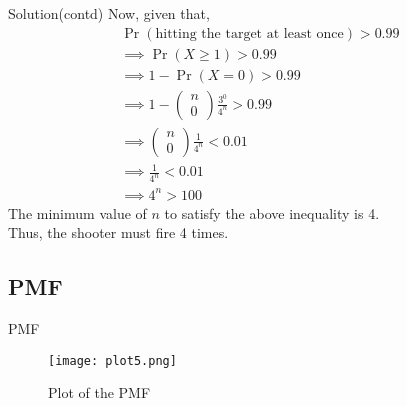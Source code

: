 \documentclass{beamer}
\newcommand{\myvec}[1]{\ensuremath{\begin{pmatrix}#1\end{pmatrix}}}
\providecommand{\pr}[1]{\ensuremath{\Pr\left(#1\right)}}
\begin{document}
\begin{frame}{Solution(contd)}
  Now, given that,
\begin{align}
\pr{\text {hitting the target at least once}} > 0.99\\
\implies \pr{X\geq 1} > 0.99\\
\implies 1-\pr{X=0} > 0.99\\
\implies 1-\myvec{n \\ 0}\frac{3^0}{4^n} > 0.99\\
\implies \myvec{n \\ 0}\frac{1}{4^n} < 0.01\\
\implies \frac{1}{4^n} < 0.01\\
\implies 4^n > 100
\end{align}
The minimum value of $n$ to satisfy the above inequality is 4.\\
Thus, the shooter must fire 4 times.   
\end{frame}

\subsection{PMF}
\begin{frame}{PMF}
\begin{figure}[H]
    \centering
    \texttt{[image: plot5.png]}
    \captionsetup{justification=centering,margin=1cm}
    \caption{Plot of the PMF}
    \label{fig:plot5}
\end{figure}
\end{frame}
\end{document}
